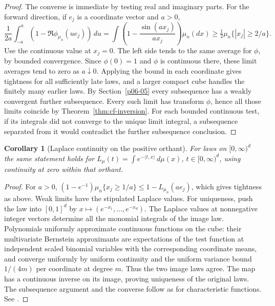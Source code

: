 \documentclass[11pt,oneside,openany]{book}
\theoremstyle{plain}
\newtheorem{corollary}[theorem]{Corollary}
\theoremstyle{definition}
\theoremstyle{remark}
\begin{document}
\begin{proof}
The converse is immediate by testing real and imaginary parts.
For the forward direction, if \(e_j\) is a coordinate vector and \(a>0\),
\[
 \frac{1}{2a}\int_{-a}^{a}(1-\Re\phi_{\mu_n}(ue_j))\,du
 =\int\left(1-\frac{\sin(a x_j)}{a x_j}\right)\mu_n(dx)
 \ge \tfrac12\mu_n\{|x_j|\ge 2/a\}.
\]
Use the continuous value at \(x_j=0\). The left side tends to the same
average for \(\phi\), by bounded convergence. Since \(\phi(0)=1\) and
\(\phi\) is continuous there, these limit averages tend to zero as
\(a\downarrow0\). Applying the bound in each coordinate gives tightness
for all sufficiently late laws, and a larger compact cube handles the
finitely many earlier laws. By Section~\ref{p06-05} every subsequence
has a weakly convergent further subsequence. Every such limit has
transform \(\phi\), hence all those limits coincide by
Theorem~\ref{thm:cf-inversion}. For each bounded continuous test, if its
integrals did not converge to the unique limit integral, a subsequence
separated from it would contradict the further subsequence conclusion.
\end{proof}

\begin{corollary}[Laplace continuity on the positive orthant]
\label{cor:laplace-cont}
For laws on \([0,\infty)^d\) the same statement holds for
\(L_\mu(t)=\int e^{-\langle t,x\rangle}\,d\mu(x)\),
\(t\in[0,\infty)^d\), using continuity at zero within that orthant.
\end{corollary}

\begin{proof}
For \(a>0\),
\((1-e^{-1})\mu_n\{x_j\ge 1/a\}\le 1-L_{\mu_n}(a e_j)\),
which gives tightness as above. Weak limits have the stipulated Laplace
values. For uniqueness, push the law into \([0,1]^d\) by
\(x\mapsto(e^{-x_1},\ldots,e^{-x_d})\). The Laplace values at nonnegative
integer vectors determine all the monomial integrals of the image law.
Polynomials uniformly approximate continuous functions on the cube:
their multivariate Bernstein approximants are expectations of the
test function at independent scaled binomial variables with the
corresponding coordinate means, and converge uniformly by uniform
continuity and the uniform variance bound \(1/(4m)\) per coordinate
at degree \(m\). Thus the two image laws agree. The map has a continuous
inverse on its image, proving uniqueness of the original laws.
The subsequence argument and the converse follow as for characteristic
functions. See \cite[Theorems 6.3 and 6.23]{Kallenberg}.
\end{proof}
\end{document}
